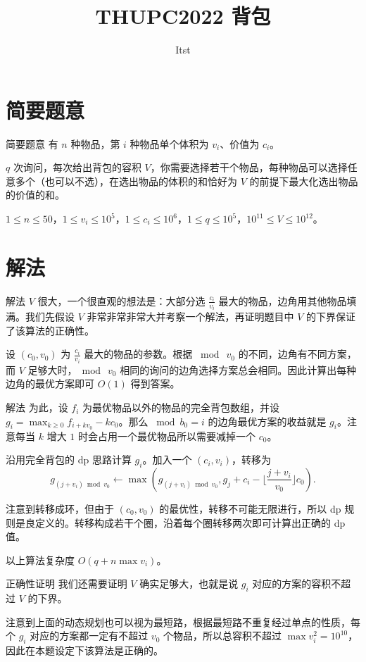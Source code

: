 \documentclass{beamer}
\title{THUPC2022 背包}
\author{Itst}
\institute{THU\ IIIS}
\begin{document}
\begin{frame}
\titlepage
\end{frame}
\section{简要题意}
\begin{frame}{简要题意}
	有 $n$ 种物品，第 $i$ 种物品单个体积为 $v_i$、价值为 $c_i$。

	$q$ 次询问，每次给出背包的容积 $V$，你需要选择若干个物品，每种物品可以选择任意多个（也可以不选），在选出物品的体积的和恰好为 $V$ 的前提下最大化选出物品的价值的和。

	$1 \le n \le 50$，$1 \le v_i \le 10^5$，$1 \le c_i \le 10^6$，$1 \le q \le 10^5$，$10^{11} \le V \le 10^{12}$。
\end{frame}
\section{解法}
\begin{frame}{解法}
	$V$ 很大，一个很直观的想法是：大部分选 $\frac{c_i}{v_i}$ 最大的物品，边角用其他物品填满。我们先假设 $V$ 非常非常非常大并考察一个解法，再证明题目中 $V$ 的下界保证了该算法的正确性。\pause

	设 $(c_0,v_0)$ 为 $\frac{c_i}{v_i}$ 最大的物品的参数。根据 $\bmod\ v_0$ 的不同，边角有不同方案，而 $V$ 足够大时，$\bmod\ v_0$ 相同的询问的边角选择方案总会相同。因此计算出每种边角的最优方案即可 $O(1)$ 得到答案。
\end{frame}
\begin{frame}{解法}
	为此，设 $f_i$ 为最优物品以外的物品的完全背包数组，并设 $g_i = \max_{k \ge 0} f_{i + kv_0} - kc_0$。那么 $\bmod b_0 = i$ 的边角最优方案的收益就是 $g_i$。注意每当 $k$ 增大 $1$ 时会占用一个最优物品所以需要减掉一个 $c_0$。\pause

	沿用完全背包的 dp 思路计算 $g_i$。加入一个 $(c_i,v_i)$，转移为 $$g_{(j + v_i) \bmod v_0} \leftarrow \max\left(g_{(j + v_i) \bmod v_0} , g_j + c_i - \lfloor \frac{j + v_i}{v_0} \rfloor c_0\right).$$\pause
	
	注意到转移成环，但由于 $(c_0,v_0)$ 的最优性，转移不可能无限进行，所以 dp 规则是良定义的。转移构成若干个圈，沿着每个圈转移两次即可计算出正确的 dp 值。

	以上算法复杂度 $O(q + n \max v_i)$。
\end{frame}
\begin{frame}{正确性证明}
	我们还需要证明 $V$ 确实足够大，也就是说 $g_i$ 对应的方案的容积不超过 $V$ 的下界。

	注意到上面的动态规划也可以视为最短路，根据最短路不重复经过单点的性质，每个 $g_i$ 对应的方案都一定有不超过 $v_0$ 个物品，所以总容积不超过 $\max v_i^2 = 10^{10}$，因此在本题设定下该算法是正确的。
\end{frame}
\end{document}
